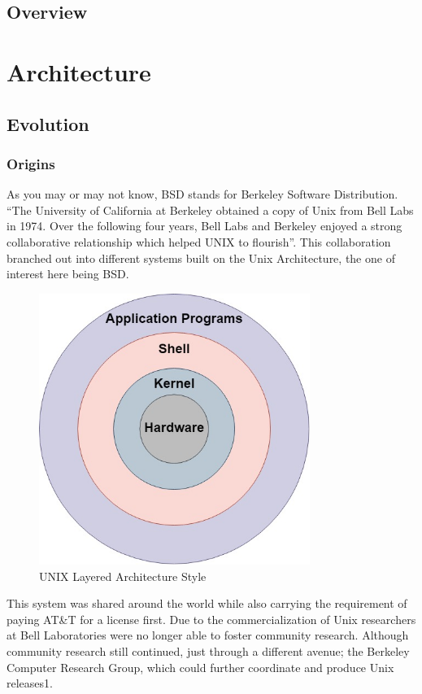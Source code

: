 \documentclass[12pt, dvipsnames, a4paper]{article}
\begin{document}
\subsection{Overview}
\lipsum[1]
\clearpage
\section{Architecture}
\subsection{Evolution}
\subsubsection{Origins}
As you may or may not know, BSD stands for Berkeley Software Distribution. “The University of California at Berkeley obtained a copy of Unix from Bell Labs in 1974. Over the following four years, Bell Labs and Berkeley enjoyed a strong collaborative relationship which helped UNIX to flourish”\cite{david}. This collaboration branched out into different systems built on the Unix Architecture, the one of interest here being BSD. 
\begin{figure}[h]
	\center
	\includegraphics[width=250pt]{assets/Unix_Architecture.jpg}
	\caption{UNIX Layered Architecture Style}
\end{figure}
This system was shared around the world while also carrying the requirement of paying AT\&T for a license first. Due to the commercialization of Unix researchers at Bell Laboratories were no longer able to foster community research. Although community research still continued, just through a different avenue; the Berkeley Computer Research Group, which could further coordinate and produce Unix releases1\cite{david}.
\end{document}
